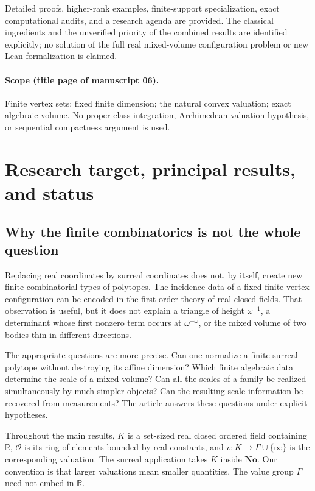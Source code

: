 \documentclass[11pt,a4paper]{article}
\numberwithin{equation}{section}
\theoremstyle{plain}
\newcommand{\No}{\mathbf{No}}
\newcommand{\R}{\mathbb R}
\newcommand{\OO}{\mathcal O}
\begin{document}
Detailed proofs, higher-rank examples, finite-support specialization,
exact computational audits, and a research agenda are provided. The
classical ingredients and the unverified priority of the combined results
are identified explicitly; no solution of the full real mixed-volume
configuration problem or new Lean formalization is claimed.

\paragraph{Scope (title page of manuscript 06).}
Finite vertex sets; fixed finite dimension; the natural
convex valuation; exact algebraic volume. No proper-class integration,
Archimedean valuation hypothesis, or sequential compactness argument is used.


\section{Research target, principal results, and status}
\label{poly:mv:sec:intro}

\subsection{Why the finite combinatorics is not the whole question}
Replacing real coordinates by surreal coordinates does not, by itself,
create new finite combinatorial types of polytopes. The incidence data of
a fixed finite vertex configuration can be encoded in the first-order
theory of real closed fields. That observation is useful, but it does not
explain a triangle of height $\omega^{-1}$, a determinant whose first
nonzero term occurs at $\omega^{-\omega}$, or the mixed volume of two
bodies thin in different directions.

The appropriate questions are more precise. Can one normalize a finite
surreal polytope without destroying its affine dimension? Which finite
algebraic data determine the scale of a mixed volume? Can all the scales
of a family be realized simultaneously by much simpler objects? Can the
resulting scale information be recovered from measurements? The article
answers these questions under explicit hypotheses.

Throughout the main results, $K$ is a set-sized real closed ordered field
containing $\R$, $\OO$ is its ring of elements bounded by real constants,
and $v:K\to\Gamma\cup\{\infty\}$ is the corresponding valuation. The
surreal application takes $K$ inside $\No$. Our convention is that larger
valuations mean smaller quantities. The value group $\Gamma$ need not
embed in $\R$.
\end{document}
